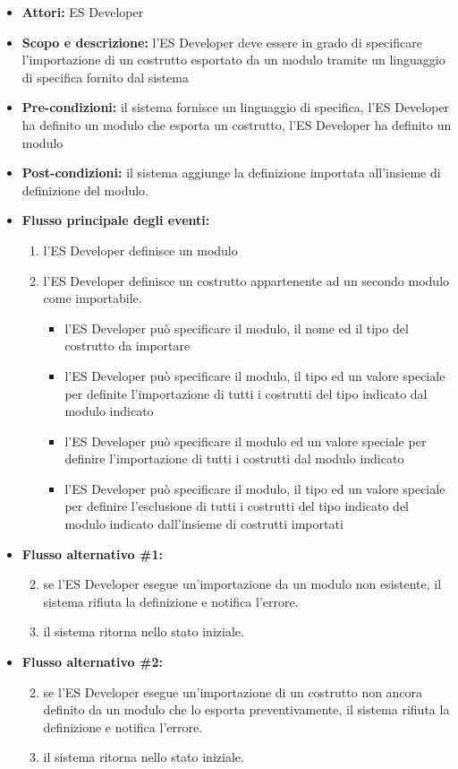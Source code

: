 \begin{itemize}
	\item \textbf{Attori:} ES Developer
	\item \textbf{Scopo e descrizione:} l'ES Developer deve essere in grado di specificare l'importazione di un costrutto esportato da un modulo tramite un linguaggio di specifica fornito dal sistema
	\item \textbf{Pre-condizioni:} il sistema fornisce un linguaggio di specifica, l'ES Developer ha definito un modulo che esporta un costrutto, l'ES Developer ha definito un modulo
	\item \textbf{Post-condizioni:} il sistema aggiunge la definizione importata all'insieme di definizione del modulo.
	\item \textbf{Flusso principale degli eventi:}
		\begin{enumerate}
			\item l'ES Developer definisce un modulo
			\item l'ES Developer definisce un costrutto appartenente ad un secondo modulo come importabile.
				\begin{itemize}
					\item l'ES Developer può specificare il modulo, il nome ed il tipo del costrutto da importare
					\item l'ES Developer può specificare il modulo, il tipo ed un valore speciale per definite l'importazione di tutti i costrutti del tipo indicato dal modulo indicato
					\item l'ES Developer può specificare il modulo ed un valore speciale per definire l'importazione di tutti i costrutti dal modulo indicato
					
					\item l'ES Developer può specificare il modulo, il tipo ed un valore speciale per definire l'esclusione di tutti i costrutti del tipo indicato del modulo indicato dall'insieme di costrutti importati
				\end{itemize}
		\end{enumerate}
	\item \textbf{Flusso alternativo \#1:} 
		\begin{enumerate}
			\setcounter{enumi}{1}
			\item se l'ES Developer esegue un'importazione da un modulo non esistente, il sistema rifiuta la definizione e notifica l'errore.
			\item il sistema ritorna nello stato iniziale.
		\end{enumerate}
		
	\item \textbf{Flusso alternativo \#2:} 
		\begin{enumerate}
			\setcounter{enumi}{1}
			\item se l'ES Developer esegue un'importazione di un costrutto non ancora definito da un modulo che lo esporta preventivamente, il sistema rifiuta la definizione e notifica l'errore.
			\item il sistema ritorna nello stato iniziale.
		\end{enumerate}
		
\end{itemize}


